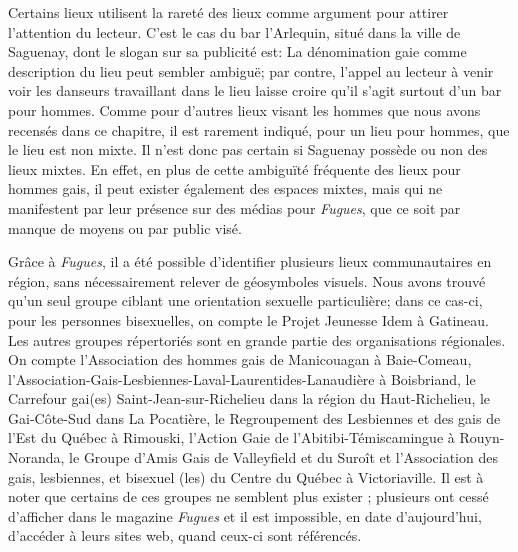 Certains lieux utilisent la rareté des lieux \lgbt{} comme argument pour attirer l'attention du lecteur.
C'est le cas du bar l'Arlequin, situé dans la ville de Saguenay, dont le slogan sur sa publicité est: 
La dénomination gaie comme description du lieu peut sembler ambiguë; par contre, l'appel au lecteur à venir voir les danseurs travaillant dans le lieu laisse croire qu'il s'agit surtout d'un bar pour hommes.
Comme pour d'autres lieux visant les hommes que nous avons recensés dans ce chapitre, il est rarement indiqué, pour un lieu pour hommes, que le lieu est non mixte.
Il n'est donc pas certain si Saguenay possède ou non des lieux mixtes.
En effet, en plus de cette ambiguïté fréquente des lieux pour hommes gais, il peut exister également des espaces mixtes, mais qui ne manifestent par leur présence sur des médias pour \emph{Fugues}, que ce soit par manque de moyens ou par public visé.

Grâce à \emph{Fugues}, il a été possible d'identifier plusieurs lieux communautaires en région, sans nécessairement relever de géosymboles visuels.
Nous avons trouvé qu'un seul groupe ciblant une orientation sexuelle particulière; dans ce cas-ci, pour les personnes bisexuelles, on compte le Projet Jeunesse Idem à Gatineau.
Les autres groupes répertoriés sont en grande partie des organisations régionales.
On compte l'Association des hommes gais de Manicouagan à Baie-Comeau, l'Association-Gais-Lesbiennes-Laval-Laurentides-Lanaudière à Boisbriand, le Carrefour gai(es) Saint-Jean-sur-Richelieu dans la région du Haut-Richelieu, le Gai-Côte-Sud dans La Pocatière, le Regroupement des Lesbiennes et des gais de l'Est du Québec à Rimouski, l'Action Gaie de l'Abitibi-Témiscamingue à Rouyn-Noranda, le Groupe d'Amis Gais de Valleyfield et du Suroît et l'Association des gais, lesbiennes, et bisexuel (les) du Centre du Québec à Victoriaville.
Il est à noter que certains de ces groupes ne semblent plus exister ; plusieurs ont cessé d'afficher dans le magazine \emph{Fugues} et il est impossible, en date d'aujourd'hui, d'accéder à leurs sites web, quand ceux-ci sont référencés.


